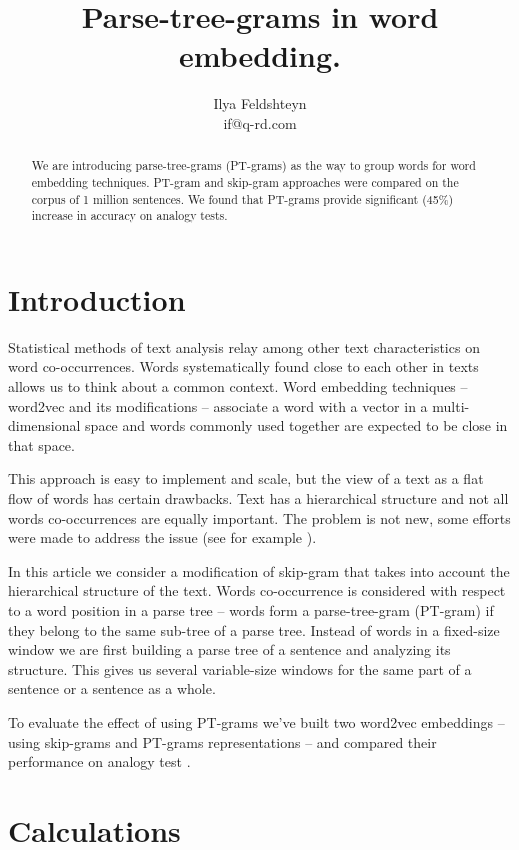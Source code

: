 \documentclass[12pt]{article}
\title{Parse-tree-grams in word embedding.}
\author{Ilya Feldshteyn\\ if@q-rd.com}
\begin{document}
\maketitle

\begin{abstract}
We are introducing parse-tree-grams (PT-grams) as the way
to group words for word embedding techniques.
PT-gram and 
skip-gram approaches were compared on the corpus of 1 million 
sentences. We found that PT-grams provide significant 
(45\%) increase in accuracy on analogy tests.
\end{abstract}


\section{Introduction}

Statistical methods of text analysis relay among other
text characteristics on word co-occurrences.
Words systematically found close to each other in texts
allows us to think about a common context. Word
embedding techniques -- word2vec and its modifications --
associate a word with a vector in a multi-dimensional
space and words commonly used together are
expected to be close in that space.

This approach is easy to implement and scale,
but the view of a text as a flat flow of words has
certain drawbacks. Text has a hierarchical structure
and not all words co-occurrences are equally important.
The problem is not new, some efforts were made to address the issue
(see for example \cite{DBLP:journals/corr/AvrahamG17}).

In this article we consider a modification of
skip-gram that takes into account the hierarchical structure of the
text. Words co-occurrence is considered with respect to a
word position in a parse tree -- words form a parse-tree-gram
(PT-gram) if they belong to the same sub-tree of a parse tree.
Instead of words in a fixed-size window we are first building
a parse tree of a sentence and analyzing its structure. This gives
us several variable-size windows for the same part of a sentence
or a sentence as a whole.

To evaluate the effect of using PT-grams we've built
two word2vec embeddings -- using skip-grams and PT-grams representations --
and compared their performance on analogy test
\cite{DBLP:journals/corr/abs-1301-3781}.

\section{Calculations}
\end{document}
